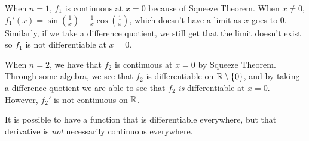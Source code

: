 \documentclass[class=article, crop=false]{standalone}
\begin{document}
  When $n = 1$, $f_1$ is continuous at $x = 0$ because of Squeeze Theorem. When $x\neq 0$, $f_1'(x) = \sin(\frac{1}{x}) - \frac{1}{x}\cos(\frac{1}{x})$, which doesn't have a limit as $x$ goes to $0$. Similarly, if we take a difference quotient, we still get that the limit doesn't exist so $f_1$ is not differentiable at $x = 0$. \par
  When $n = 2$, we have that $f_2$ is continuous at $x = 0$ by Squeeze Theorem. Through some algebra, we see that $f_2$ is differentiable on $\mathbb{R}\setminus \left\{0\right\}$, and by taking a difference quotient we are able to see that $f_2$ \emph{is} differentiable at $x = 0$. However, $f_2'$ is not continuous on $\mathbb{R}$.
  \begin{note}{}
    It is possible to have a function that is differentiable everywhere, but that derivative is \emph{not} necessarily continuous everywhere.
  \end{note}
\end{document}
